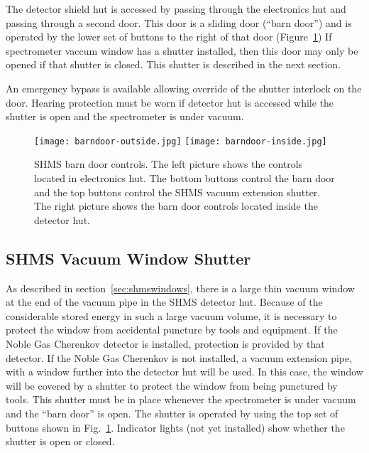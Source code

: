 {The detector shield hut is accessed by passing through the electronics
hut and passing through a second door.  This door is a sliding door
(``barn door'') and is operated by the lower set of buttons to the
right of that door (Figure~\ref{fig:barndoorcontrol})  If spectrometer
vaccum window has a shutter installed, then this door may only be
opened if that shutter is closed.  This shutter is described in the
next section.

An emergency bypass is available allowing override of the shutter
interlock on the door.  Hearing protection must be worn if detector
hut is accessed while the shutter is open and the spectrometer is
under vacuum.

\begin{figure}
\begin{center}
\texttt{[image: barndoor-outside.jpg]}
\texttt{[image: barndoor-inside.jpg]}
\caption{\label{fig:barndoorcontrol}SHMS barn door controls.  The left
  picture shows the controls located in electronics hut.  The bottom
  buttons control the barn door and the top buttons control the SHMS
  vacuum extension shutter.  The right picture shows the barn door controls
  located inside the detector hut.}
\end{center}
\end{figure}

\subsection{SHMS Vacuum Window Shutter}
\label{sec:shmsshutter}
As described in section~\ref{sec:shmswindows}, there is a large thin
vacuum window at the end of the vacuum pipe in the SHMS detector hut.
Because of
the considerable stored energy in such a large vacuum volume, it is
necessary to protect the window from accidental puncture by
tools and equipment.
If
the Noble Gas Cherenkov detector is installed, protection is provided
by that detector.
If the Noble Gas Cherenkov is not installed, a vacuum
extension pipe, with a window further into the detector hut will be
used.  In this case, the window will be covered by a shutter to
protect the window from being punctured by tools.
This shutter must be in place whenever the spectrometer is under vacuum and
the ``barn door'' is open.  The shutter is operated by using the top
set of buttons shown in Fig.~\ref{fig:barndoorcontrol}.  Indicator
lights (not yet installed) show whether the shutter is open or closed.




}%
